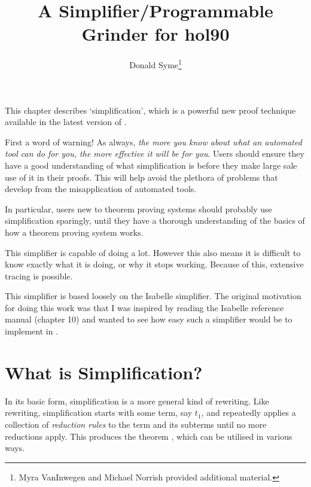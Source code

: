 

\title{A Simplifier/Programmable Grinder for hol90} \author{Donald
  Syme\thanks{Myra VanInwegen and Michael Norrish provided additional
    material.}}





\maketitle

This chapter describes `simplification', which is a
powerful new proof technique available in the latest version
of \HOL.

First a word of warning! As always, {\em the more you know about what
  an automated tool can do for you, the more effective it will be for
  you}. Users should ensure they have a good understanding of what
simplification is before they make large sale use of it in their
proofs.  This will help avoid the plethora of problems that develop
from the misapplication of automated tools.

In particular, users new to theorem proving systems should probably
use simplification sparingly, until they have a thorough understanding
of the basics of how a theorem proving system works.

This simplifier is capable of doing a lot.  However this also means it
is difficult to know exactly what it is doing, or why it stops
working.  Because of this, extensive tracing is possible.

This simplifier is based loosely on the Isabelle simplifier.  The
original motivation for doing this work was that I was inspired by
reading the Isabelle reference manual (chapter 10) and wanted to see
how easy such a simplifier would be to implement in \HOL.

\section{What is Simplification?}

In its basic form, simplification is a more general
kind of rewriting. Like rewriting, simplification
starts with some term, say $t_1$, and repeatedly applies
a collection of {\it reduction rules} to the term and its
subterms until no more reductions apply.  This produces
the theorem , which can be utilised
in various ways.

